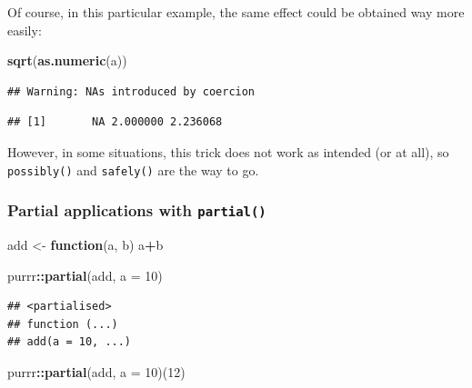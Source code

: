 \documentclass[]{gitbook}
\newenvironment{Shaded}{\begin{snugshade}}{\end{snugshade}}
\newcommand{\ControlFlowTok}[1]{\textcolor[rgb]{0.13,0.29,0.53}{\textbf{#1}}}
\newcommand{\DataTypeTok}[1]{\textcolor[rgb]{0.13,0.29,0.53}{#1}}
\newcommand{\DecValTok}[1]{\textcolor[rgb]{0.00,0.00,0.81}{#1}}
\newcommand{\KeywordTok}[1]{\textcolor[rgb]{0.13,0.29,0.53}{\textbf{#1}}}
\newcommand{\NormalTok}[1]{#1}
\newcommand{\OperatorTok}[1]{\textcolor[rgb]{0.81,0.36,0.00}{\textbf{#1}}}
\newcommand{\StringTok}[1]{\textcolor[rgb]{0.31,0.60,0.02}{#1}}
\begin{document}
Of course, in this particular example, the same effect could be obtained way more easily:

\begin{Shaded}
\begin{Highlighting}[]
\KeywordTok{sqrt}\NormalTok{(}\KeywordTok{as.numeric}\NormalTok{(a))}
\end{Highlighting}
\end{Shaded}

\begin{verbatim}
## Warning: NAs introduced by coercion
\end{verbatim}

\begin{verbatim}
## [1]       NA 2.000000 2.236068
\end{verbatim}

However, in some situations, this trick does not work as intended (or at all), so \texttt{possibly()} and
\texttt{safely()} are the way to go.

\hypertarget{partial-applications-with-partial}{%
\subsubsection{\texorpdfstring{Partial applications with \texttt{partial()}}{Partial applications with partial()}}\label{partial-applications-with-partial}}

\begin{Shaded}
\begin{Highlighting}[]
\NormalTok{add <-}\StringTok{ }\ControlFlowTok{function}\NormalTok{(a, b) a}\OperatorTok{+}\NormalTok{b}
\end{Highlighting}
\end{Shaded}

\begin{Shaded}
\begin{Highlighting}[]
\NormalTok{purrr}\OperatorTok{::}\KeywordTok{partial}\NormalTok{(add, }\DataTypeTok{a =} \DecValTok{10}\NormalTok{)}
\end{Highlighting}
\end{Shaded}

\begin{verbatim}
## <partialised>
## function (...) 
## add(a = 10, ...)
\end{verbatim}

\begin{Shaded}
\begin{Highlighting}[]
\NormalTok{purrr}\OperatorTok{::}\KeywordTok{partial}\NormalTok{(add, }\DataTypeTok{a =} \DecValTok{10}\NormalTok{)(}\DecValTok{12}\NormalTok{)}
\end{Highlighting}
\end{Shaded}
\end{document}
